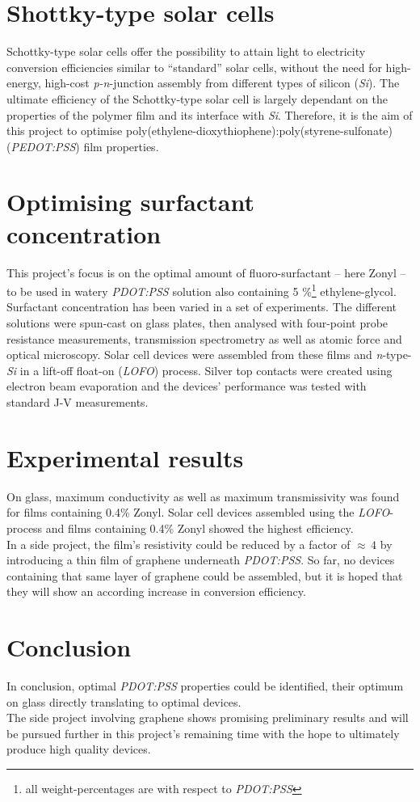 \documentclass[a4paper,10pt]{article}
\begin{document}
\section*{Shottky-type solar cells}
Schottky-type solar cells offer the possibility to attain light to electricity conversion efficiencies similar to ``standard'' solar cells, without the need for high-energy, high-cost \emph{p-n}-junction assembly from different types of silicon (\emph{Si}). The ultimate efficiency of the Schottky-type solar cell is largely dependant on the properties of the polymer film and its interface with \emph{Si}. Therefore, it is the aim of this project to optimise poly(ethylene-dioxythiophene):poly(styrene-sulfonate) (\emph{PEDOT:PSS}) film properties.
\section*{Optimising surfactant concentration}
This project's focus is on the optimal amount of fluoro-surfactant -- here Zonyl\textsuperscript{\textregistered} -- to be used in watery \emph{PDOT:PSS} solution also containing 5 \%\footnote{all weight-percentages are with respect to \emph{PDOT:PSS}} ethylene-glycol. Surfactant concentration has been varied in a set of experiments. The different solutions were spun-cast on glass plates, then analysed with four-point probe resistance measurements, transmission spectrometry as well as atomic force and optical microscopy. Solar cell devices were assembled from these films and \emph{n}-type-\emph{Si} in a lift-off float-on (\emph{LOFO}) process. Silver top contacts were created using electron beam evaporation and the devices' performance was tested with standard J-V measurements.
\section*{Experimental results}
On glass, maximum conductivity as well as maximum transmissivity was found for films containing 0.4\% Zonyl. Solar cell devices assembled using the \emph{LOFO}-process and films containing 0.4\% Zonyl showed the highest efficiency.\\
In a side project, the film's resistivity could be reduced by a factor of $\approx \, 4$ by introducing a thin film of graphene underneath \emph{PDOT:PSS}. So far, no devices containing that same layer of graphene could be assembled, but it is hoped that they will show an according increase in conversion efficiency. 
\section*{Conclusion}
In conclusion, optimal \emph{PDOT:PSS} properties could be identified, their optimum on glass directly translating to optimal devices.\\
The side project involving graphene shows promising preliminary results and will be pursued further in this project's remaining time with the hope to ultimately produce high quality devices.
\end{document}
